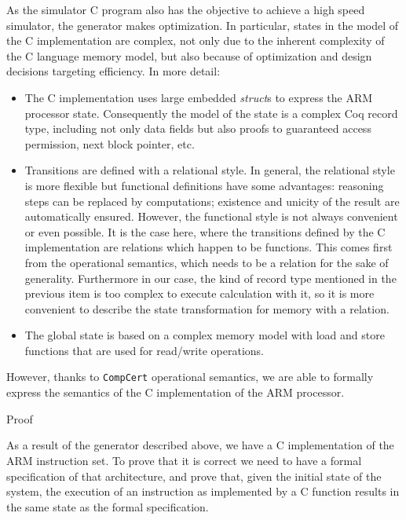 \documentclass[twocolumn]{article}
\makeatletter
\def\subsection{\@startsection {subsection}{2}{\z@}{16pt plus 2pt minus 2pt}
{6pt plus 2pt minus 2pt}{\normalsize\sl
\edef\@svsec{\thesubsection.\ }}}
\def\thesubsection{\Alph{subsection}}
\newcommand{\compcert}{\texttt{CompCert}\xspace}
\makeatother
\begin{document}
As the simulator C program also has the objective to achieve a high
speed simulator, the generator makes optimization. In particular,
states in the model of the C implementation are complex, not only due
to the inherent complexity of the C language memory model, but also
because of optimization and design decisions targeting efficiency.
In more detail:
\begin{itemize}
\item The C implementation uses large embedded \emph{struct}s to
  express the ARM processor state.  Consequently the model of the
  state is a complex Coq record type, including not only data fields
  but also proofs to guaranteed access permission, next block pointer,
  etc.
\item Transitions are defined with a relational style.  In general,
  the relational style is more flexible but functional definitions
  have some advantages: reasoning steps can be replaced by
  computations; existence and unicity of the result are automatically
  ensured.  However, the functional style is not always convenient or
  even possible.  It is the case here, where the transitions defined
  by the C implementation are relations which happen to be functions.
  This comes first from the operational semantics, which needs to be
  a relation for the sake of generality.  Furthermore in our case, the
  kind of record type mentioned in the previous item is too complex to
  execute calculation with it, so it is more convenient to describe
  the state transformation for memory with a relation.
\item The global state is based on a complex memory model with load
  and store functions that are used for read/write operations.
\end{itemize}

However, thanks to \compcert operational semantics, we are able to
formally express the semantics of the C implementation of the ARM
processor.

\subsection{Proof}

As a result of the generator described above, we have a C
implementation of the ARM instruction set.  To prove that it is
correct we need to have a formal specification of that architecture,
and prove that, given the initial state of the system, the execution
of an instruction as implemented by a C function results in the same
state as the formal specification.
\end{document}
